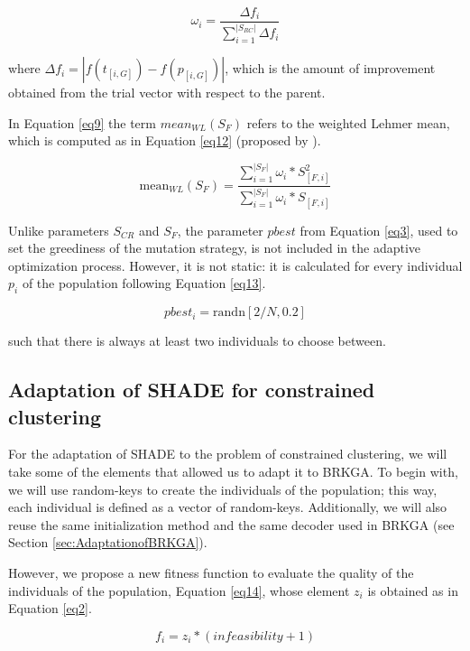 \documentclass[review]{elsarticle}
\begin{document}
\begin{equation}
\omega_i = \frac{\Delta f_i}{\sum_{i = 1}^{|S_{RC}|} \Delta f_i}
\label{eq11}
\end{equation}

where $\Delta f_i = |f(t_{[i,G]}) - f(p_{[i, G]})|$, which is the amount of improvement obtained from the trial vector with respect to the parent.

In Equation \ref{eq9} the term $mean_{WL} (S_{F})$ refers to the weighted Lehmer mean, which is computed as in Equation \eqref{eq12} (proposed by \cite{tanabe2013success}).

\begin{equation}
\text{mean}_{WL} (S_{F}) = \frac{\sum_{i = 1}^{|S_{F}|} \omega_i * S^2_{[F,i]}}{\sum_{i = 1}^{|S_{F}|} \omega_i * S_{[F,i]}}
\label{eq12}
\end{equation}

Unlike parameters $S_{CR}$ and $S_F$, the parameter $pbest$ from Equation \eqref{eq3}, used to set the greediness of the mutation strategy, is not included in the adaptive optimization process. However, it is not static: it is calculated for every individual $p_i$ of the population following Equation \eqref{eq13}.

\begin{equation}
pbest_i = \text{randn}[2/N, 0.2]
\label{eq13}
\end{equation}

such that there is always at least two individuals to choose between.

\subsection{Adaptation of SHADE for constrained clustering}

For the adaptation of SHADE to the problem of constrained clustering, we will take some of the elements that allowed us to adapt it to BRKGA. To begin with, we will use random-keys to create the individuals of the population; this way, each individual is defined as a vector of random-keys. Additionally, we will also reuse the same initialization method and the same decoder used in BRKGA (see Section \ref{sec:AdaptationofBRKGA}).

However, we propose a new fitness function to evaluate the quality of the individuals of the population, Equation \eqref{eq14}, whose element $z_i$ is obtained as in Equation \eqref{eq2}.

\begin{equation}
f_i = z_i * (infeasibility + 1)
\label{eq14}
\end{equation}
\end{document}
